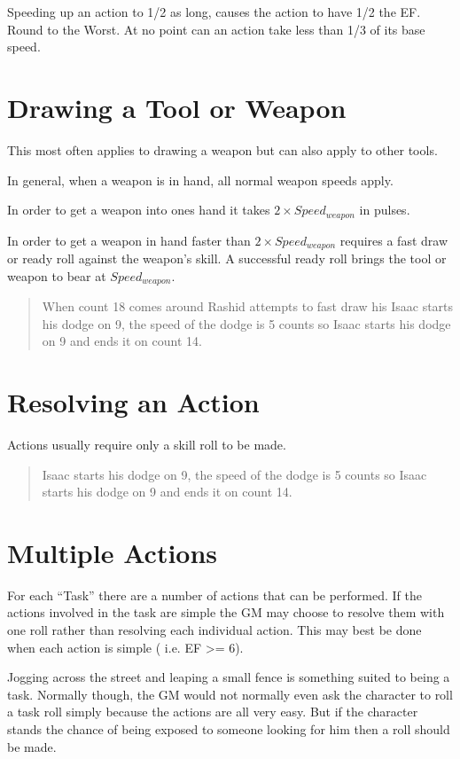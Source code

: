 Speeding up an action to 1/2 as long, causes the action to have 1/2 the 
EF. Round to the Worst. At no point can an action take less than 1/3 
of its base speed.

\section{Drawing a Tool or Weapon}

This most often applies to drawing a weapon but can also apply to 
other tools.

In general, when a weapon is in hand, all normal weapon speeds apply. 

In order to get a weapon into ones hand it takes \( 2 \times 
Speed_{weapon} \) in pulses. 

In order to get a weapon in hand faster than \( 2 \times 
Speed_{weapon} \) requires a fast draw or ready roll against the weapon's 
skill. A successful ready roll brings the tool or weapon to bear at 
\( Speed_{weapon} \).  

\begin{quote}
When count 18 comes around Rashid attempts to fast draw his Isaac 
starts his dodge on 9, the speed of the dodge is 5 counts so 
Isaac starts his dodge on 9 and ends it on count 14. 
\end{quote}
 

\section{Resolving an Action}
Actions usually require only a skill roll to be made. 

\begin{quote}
Isaac starts his dodge on 9, the speed of the dodge is 5 counts so 
Isaac starts his dodge on 9 and ends it on count 14. 
\end{quote}

\section{Multiple Actions}

For each ``Task'' there are a number of actions that can be performed. 
If the actions involved in the task are simple the GM may choose to
resolve  them with one roll rather than resolving each individual
action. This may best  be done when each action is simple ( i.e. EF >=
6). 

Jogging across the street and leaping a small fence is something suited
to being a task. Normally though, the GM would not normally even ask
the character to roll a task roll simply because the actions are all
very easy. But if the character stands the chance of being exposed to
someone looking for him then a roll should be made. 

